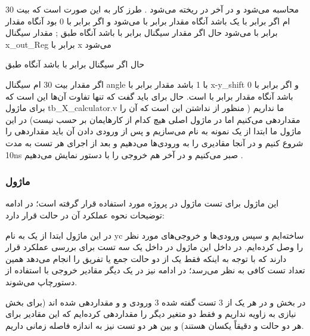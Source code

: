 \documentclass[12pt,titlepage,a4page , tikz , multi,table , svgnames,xcdraw]{article}
\begin{document}

 محاسبه می‌شود و در آخر در   ریخته می‌شود . طرز کار به این صورت است که بیت 30 ام   اگر برابر با یک باشد آنگاه مقدار   برابر با   می‌شود و اگر برابر با 0 بود  آنگاه مقدار   برابر با   می‌شود
حال اگر مقدار سیگنال   برابر با   باشد آنگاه طبق ; مقدار سیگنال x\_out\_Reg  برابر با x می‌شود

حال اگر سیگنال  برابر با   باشد آنگاه طبق


 
 اگر مقدار  بیت 30 ام سیگنال angle   با 1 باشد مقدار  برابر با x-y\_shift  و اگر برابر با 0 باشد آنگاه مقدار   برابر با   است.
حال برای   باید گفت که تنها تفاوت آن‌ها این است که برای ماژول tb\_X\_calculator.v  ما   نداریم ( منظور از نداشتن این است که آن را مقداردهی می‌کنیم اما در ماژول اصلی هیچ کدام از کارهایمان بر حسب   نیست) در این ماژول ما ابتدا از  یک نمونه به نام   می‌سازیم و پس از ورودی دادن آن باید مقداردهی را شروع کنیم و در آنجا مقادیری را به ورودی‌ها می‌دهیم و بعد از اجرای هر تست به مدت 10ns  صبر می‌کنیم و در آخر هم خروجی را با  دستور   نمایش می‌دهیم .

\subsubsection{ماژول }



این ماژول برای تست ماژول در پروژه مورد استفاده قرار گرفته است؛ در ادامه توضیحات نحوه عملکرد آن در حالت  قرار دارد:


در این ماژول ابتدا از  یک  به نام yc ساخته‌ایم و سپس ورودی‌ها و خروجی‌های مورد نظر را وصل کرده‌ایم. در داخل این ماژول در داخل یک  سه تست برای بررسی عملکرد  قرار دارند که با توجه به اینکه فقط یک از دو حالت جمع یا تفریق را انجام می‌دهد همین تعداد تست کافی به نظر می‌رسد؛ در ادامه نیز در یک  دیگر مقادیر خروجی  با استفاده از دستورچاپ می‌شوند.


در بخش  و در هر یک از 3 تست گفته شده 3 ورودی  و  و  مقداردهی شده اند (برای بخش  نیازی به زاویه نداریم و فقط دو متغیر دیگر را مقداردهی کرده‌ایم که این مقادیر برای هر دو حالت  و  دقیقاً یکسان هستند) و بین هر دو تست نیز به اندازه  فاصله زمانی داریم.
\end{document}
